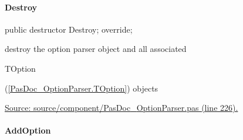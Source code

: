 \documentclass{report}
\newif\ifpdf
\begin{document}
\paragraph*{Destroy}\hspace*{\fill}

\label{PasDoc_OptionParser.TOptionParser-Destroy}
\begin{list}{}{
\setlength{\itemindent}{0cm}
\setlength{\listparindent}{0cm}
\setlength{\leftmargin}{\evensidemargin}
\addtolength{\leftmargin}{\tmplength}
\settowidth{\labelsep}{X}
\addtolength{\leftmargin}{\labelsep}
\setlength{\labelwidth}{\tmplength}
}
\item[\textbf{Declaration}\hfill]
\ifpdf
\begin{flushleft}
\fi
\begin{ttfamily}
public destructor Destroy; override;\end{ttfamily}

\ifpdf
\end{flushleft}
\fi

\par
\item[\textbf{Description}]
destroy the option parser object and all associated \begin{ttfamily}TOption\end{ttfamily}(\ref{PasDoc_OptionParser.TOption}) objects\par
\href{https://github.com/pasdoc/pasdoc/blob/master/source/component/PasDoc_OptionParser.pas#L226}{Source: source/component/PasDoc{\_}OptionParser.pas (line 226).}

\end{list}
\paragraph*{AddOption}\hspace*{\fill}
\end{document}

